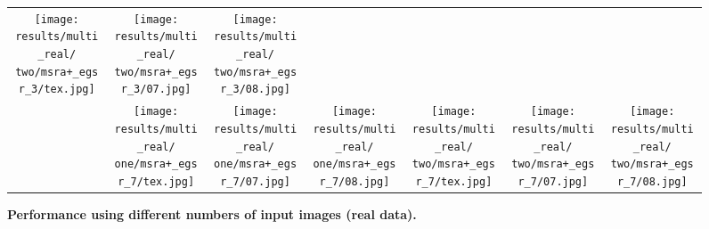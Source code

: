 \begin{figure*}[t]
\begin{tabular}{cccc@{\hspace{4\tabcolsep}}ccc}
		\texttt{[image: results/multi\_real/\\two/msra+\_egsr\_3/tex.jpg]} &
		\texttt{[image: results/multi\_real/\\two/msra+\_egsr\_3/07.jpg]} &
		\texttt{[image: results/multi\_real/\\two/msra+\_egsr\_3/08.jpg]}
		\\
		\raisebox{\raiseLen}{\rotatebox[origin=c]{90}{\footnotesize{[Gao19]+ (7)}}} &
		\texttt{[image: results/multi\_real/\\one/msra+\_egsr\_7/tex.jpg]} &
		\texttt{[image: results/multi\_real/\\one/msra+\_egsr\_7/07.jpg]} &
		\texttt{[image: results/multi\_real/\\one/msra+\_egsr\_7/08.jpg]} &
		\texttt{[image: results/multi\_real/\\two/msra+\_egsr\_7/tex.jpg]} &
		\texttt{[image: results/multi\_real/\\two/msra+\_egsr\_7/07.jpg]} &
		\texttt{[image: results/multi\_real/\\two/msra+\_egsr\_7/08.jpg]}
	\end{tabular}
	\caption{\label{fig:results_multi_inputs}
		\textbf{Performance using different numbers of input images (real data).}
	}
\end{figure*}
